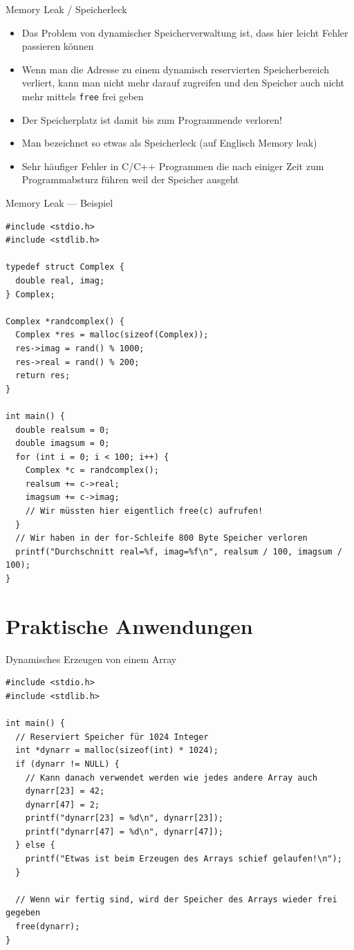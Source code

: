 \documentclass[presentation]{beamer}
\begin{document}
\begin{frame}[label={sec:orgd6093cc},fragile]{Memory Leak / Speicherleck}
 \begin{itemize}
\item Das Problem von dynamischer Speicherverwaltung ist, dass hier leicht
Fehler passieren können
\item Wenn man die Adresse zu einem dynamisch reservierten Speicherbereich
verliert, kann man \alert{nicht mehr darauf zugreifen} und den Speicher
auch \alert{nicht mehr mittels {\color{solarizedYellow}\texttt{free} }frei geben}
\item Der Speicherplatz ist damit \alert{bis zum Programmende verloren}!
\item Man bezeichnet so etwas als Speicherleck (auf Englisch Memory leak)
\item Sehr \alert{häufiger Fehler} in C/C++ Programmen die nach einiger Zeit zum
\alert{Programmabsturz} führen weil der \alert{Speicher ausgeht}
\end{itemize}
\end{frame}
\begin{frame}[label={sec:org43b57b3},fragile]{Memory Leak --- Beispiel}
 \begin{verbatim}
#include <stdio.h>
#include <stdlib.h>

typedef struct Complex {
  double real, imag;
} Complex;

Complex *randcomplex() {
  Complex *res = malloc(sizeof(Complex));
  res->imag = rand() % 1000;
  res->real = rand() % 200;
  return res;
}

int main() {
  double realsum = 0;
  double imagsum = 0;
  for (int i = 0; i < 100; i++) {
    Complex *c = randcomplex();
    realsum += c->real;
    imagsum += c->imag;
    // Wir müssten hier eigentlich free(c) aufrufen!
  }
  // Wir haben in der for-Schleife 800 Byte Speicher verloren
  printf("Durchschnitt real=%f, imag=%f\n", realsum / 100, imagsum / 100);
}
\end{verbatim}
\end{frame}

\section{Praktische Anwendungen}
\label{sec:org0cc0b68}
\begin{frame}[label={sec:orgd6460e4},fragile]{Dynamisches Erzeugen von einem Array}
 \begin{verbatim}
#include <stdio.h>
#include <stdlib.h>

int main() {
  // Reserviert Speicher für 1024 Integer
  int *dynarr = malloc(sizeof(int) * 1024);
  if (dynarr != NULL) {
    // Kann danach verwendet werden wie jedes andere Array auch
    dynarr[23] = 42;
    dynarr[47] = 2;
    printf("dynarr[23] = %d\n", dynarr[23]);
    printf("dynarr[47] = %d\n", dynarr[47]);
  } else {
    printf("Etwas ist beim Erzeugen des Arrays schief gelaufen!\n");
  }

  // Wenn wir fertig sind, wird der Speicher des Arrays wieder frei gegeben
  free(dynarr);
}
\end{verbatim}
\end{frame}
\end{document}
